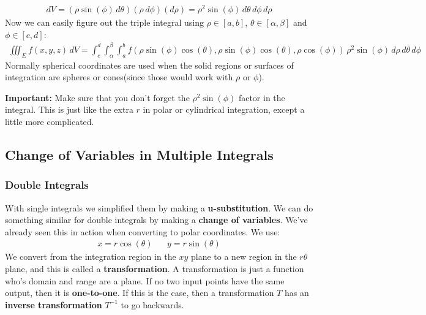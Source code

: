 \documentclass{article}
\begin{document}
\begin{gather*}
    dV = (\rho \sin(\phi) \,d \theta)(\rho \,d\phi)(d\rho) = \rho^2 \sin(\phi) \,d\theta \, d\phi\, d\rho
\end{gather*}
Now we can easily figure out the triple integral using $\rho \in [a,b]$, $\theta \in [\alpha, \beta]$ and $\phi \in [c,d]$:
\begin{gather*}
    \iiint_E f(x,y,z)\, dV = \int_c^d \int_\alpha^\beta \int_a^b f(\rho\sin(\phi)\cos(\theta), \rho\sin(\phi)\cos(\theta), \rho\cos(\phi)) \, \rho^2 \sin(\phi) \,d\rho\, d\theta\,d\phi
\end{gather*}
Normally spherical coordinates are used when the solid regions or surfaces of integration are spheres or cones(since those would work with $\rho$ or $\phi$).

\textbf{Important: }Make sure that you don't forget the $\rho^2 \sin(\phi)$ factor in the integral. This is just like the extra $r$ in polar or cylindrical integration, except a little more complicated.
\subsection{Change of Variables in Multiple Integrals}
\subsubsection{Double Integrals}
With single integrals we simplified them by making a \textbf{u-substitution}. We can do something similar for double integrals by making a \textbf{change of variables}. We've already seen this in action when converting to polar coordinates. We use:
\begin{gather*}
    x = r \cos(\theta)\hspace{20pt}y = r\sin(\theta)
\end{gather*}
We convert from the integration region in the $xy$ plane to a new region in the $r\theta$ plane, and this is called a \textbf{transformation}. A transformation is just a function who's domain and range are a plane. If no two input points have the same output, then it is \textbf{one-to-one}. If this is the case, then a transformation $T$ has an \textbf{inverse transformation} $T^{-1}$ to go backwards.
\end{document}

